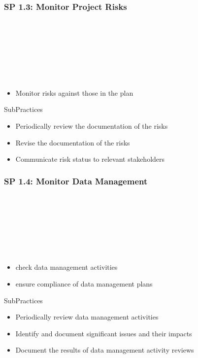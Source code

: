 \documentclass[accentcolor=tud1b]{tudbeamer}
\newcommand{\strong}[1]{\textaccentcolor{\textsf{\textbf{#1}}}}
\newenvironment*{tframe}[1][]{%
	\begin{frame}
	\ifnum\Level=2
		\frametitle{\insertsectionhead\\\strong{#1}}
	\fi\ifnum\Level=3
		\frametitle{\insertsectionhead\\\strong{\insertsubsectionhead} \textnormal{#1}}
	\fi\ifnum\Level=4
		\frametitle{\insertsubsectionhead\\\strong{\insertsubsubsectionhead} #1}
	\fi
}{%
	\end{frame}
}
\begin{document}
\subsubsection{SP 1.3: Monitor Project Risks}
\begin{tframe}
	\begin{itemize}
		\item Monitor risks against those in the plan
	\end{itemize}
	\begin{block}{SubPractices}
		\begin{itemize}
		  \item Periodically review the documentation of the risks
		  \item Revise the documentation of the risks
		  \item Communicate risk status to relevant stakeholders
		\end{itemize}
	\end{block}
\end{tframe}

\subsubsection{SP 1.4: Monitor Data Management}
\begin{tframe}
	\begin{itemize}
		\item check data management activities
		\item ensure compliance of data management plans
	\end{itemize}
		\begin{block}{SubPractices}
		\begin{itemize}
		  \item Periodically review data management activities
		  \item Identify and document significant issues and their impacts
		  \item Document the results of data management activity reviews
		\end{itemize}
	\end{block}
\end{tframe}
\end{document}
